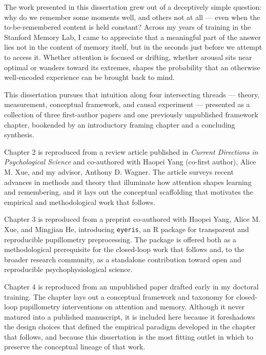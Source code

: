 
The work presented in this dissertation grew out of a deceptively simple question: why do we remember some moments well, and others not at all --- even when the to-be-remembered content is held constant? Across my years of training in the Stanford Memory Lab, I came to appreciate that a meaningful part of the answer lies not in the content of memory itself, but in the seconds just before we attempt to access it. Whether attention is focused or drifting, whether arousal sits near optimal or wanders toward its extremes, shapes the probability that an otherwise well-encoded experience can be brought back to mind.

This dissertation pursues that intuition along four intersecting threads --- theory, measurement, conceptual framework, and causal experiment --- presented as a collection of three first-author papers and one previously unpublished framework chapter, bookended by an introductory framing chapter and a concluding synthesis.

Chapter 2 is reproduced from a review article published in \textit{Current Directions in Psychological Science} and co-authored with Haopei Yang (co-first author), Alice M. Xue, and my advisor, Anthony D. Wagner. The article surveys recent advances in methods and theory that illuminate how attention shapes learning and remembering, and it lays out the conceptual scaffolding that motivates the empirical and methodological work that follows.

Chapter 3 is reproduced from a preprint co-authored with Haopei Yang, Alice M. Xue, and Mingjian He, introducing \texttt{eyeris}, an R package for transparent and reproducible pupillometry preprocessing. The package is offered both as a methodological prerequisite for the closed-loop work that follows and, to the broader research community, as a standalone contribution toward open and reproducible psychophysiological science.

Chapter 4 is reproduced from an unpublished paper drafted early in my doctoral training. The chapter lays out a conceptual framework and taxonomy for closed-loop pupillometry interventions on attention and memory. Although it never matured into a published manuscript, it is included here because it foreshadows the design choices that defined the empirical paradigm developed in the chapter that follows, and because this dissertation is the most fitting outlet in which to preserve the conceptual lineage of that work.

